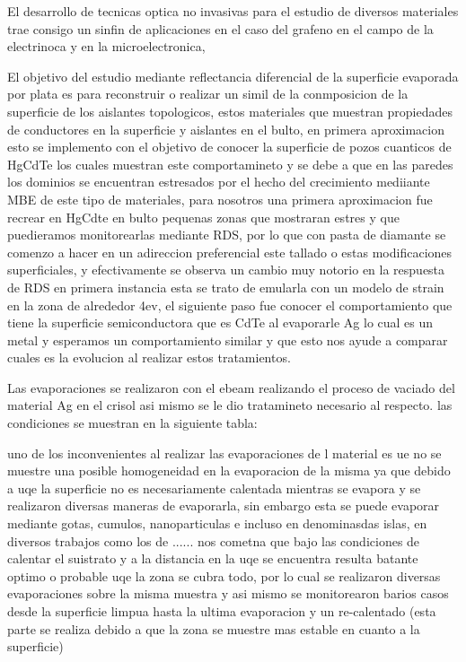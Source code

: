 El desarrollo de tecnicas optica no invasivas para el estudio de diversos materiales trae consigo un sinfin de aplicaciones en el caso del grafeno en el campo de la electrinoca y en la microelectronica, 

El objetivo del estudio mediante reflectancia diferencial de la superficie evaporada por plata es para reconstruir o realizar un simil de la conmposicion de la superficie de los aislantes topologicos, estos materiales que muestran propiedades de conductores en la superficie y aislantes en el bulto, en primera aproximacion esto se implemento con el objetivo de conocer la superficie de pozos cuanticos de HgCdTe los cuales muestran este comportamineto y se debe a que en las paredes los dominios se encuentran estresados por el hecho del crecimiento mediiante MBE de este tipo de materiales, para nosotros una primera aproximacion fue recrear en HgCdte en bulto pequenas zonas que mostraran estres y que puedieramos monitorearlas mediante RDS, por lo que con pasta de diamante se comenzo a hacer en un adireccion preferencial este tallado o estas modificaciones superficiales, y efectivamente se observa un cambio muy notorio en la respuesta de RDS en primera instancia esta se trato de emularla con un modelo de strain en la zona de alrededor 4ev, el siguiente paso fue conocer el comportamiento que tiene la superficie semiconductora que es CdTe al evaporarle Ag lo cual es un metal y esperamos un comportamiento similar y que esto nos ayude a comparar cuales es la evolucion al realizar estos tratamientos. 


Las evaporaciones se realizaron con el ebeam realizando el proceso de vaciado del material Ag en el crisol asi mismo se le dio tratamineto necesario al respecto. las condiciones se muestran en la siguiente tabla: 


uno de los inconvenientes al realizar las evaporaciones de l material es ue no se muestre una posible homogeneidad en la evaporacion de la misma ya que debido a uqe la superficie no es necesariamente calentada mientras se evapora y se realizaron diversas maneras de evaporarla, sin embargo esta se puede evaporar mediante gotas, cumulos, nanoparticulas e incluso en denominasdas islas, en diversos trabajos como los de ...... nos cometna que bajo las condiciones de calentar el suistrato y a la distancia en la uqe se encuentra resulta batante optimo o probable uqe la zona se cubra todo, por lo cual se realizaron diversas evaporaciones sobre la misma muestra y asi mismo se monitorearon barios casos desde la superficie limpua hasta la ultima evaporacion  y un re-calentado (esta parte se realiza debido a que la zona se muestre mas estable en cuanto a la superficie)

